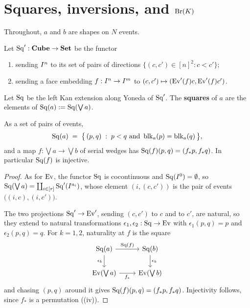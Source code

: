 \documentclass[11pt]{article}
\begin{document}
\section{Squares, inversions, and \texorpdfstring{$\operatorname{Br}(K)$}{Br(K)}}\label{sec:squares}


Throughout, $a$ and $b$ are shapes on $N$ events.

\begin{definition}\label{def:squares}
  Let $\operatorname{Sq}' : \mathbf{Cube} \to \mathbf{Set}$ be the functor
  \begin{enumerate}
    \item sending $I^{n}$ to its set of pairs of directions $\{(c,c') \in [n]^2 : c < c'\}$;
    \item sending a face embedding $f : I^{n} \to I^{m}$ to
      $(c,c') \mapsto (\operatorname{Ev}'(f)c, \operatorname{Ev}'(f)c')$.
  \end{enumerate}
  Let $\operatorname{Sq}$ be the left Kan extension along Yoneda of $\operatorname{Sq}'$. The \textbf{squares} of $a$ are the
  elements of $\operatorname{Sq}(a) := \operatorname{Sq}(\bigvee a)$.
\end{definition}

\begin{lemma}\label{lem:sq-coords}
  As a set of pairs of events,
  \[
    \operatorname{Sq}(a) \;=\; \bigl\{\, (p,q) \;:\; p < q \text{ and } \operatorname{blk}_a(p) = \operatorname{blk}_a(q) \,\bigr\} ,
  \]
  and a map $f : \bigvee a \to \bigvee b$ of serial wedges has $\operatorname{Sq}(f)(p,q) = (f_*p, f_*q)$. In
  particular $\operatorname{Sq}(f)$ is injective.
\end{lemma}
\begin{proof}
  As for $\operatorname{Ev}$, the functor $\operatorname{Sq}$ is cocontinuous and $\operatorname{Sq}(I^{0}) = \emptyset$, so
  $\operatorname{Sq}(\bigvee a) = \coprod_{i \in [r]} \operatorname{Sq}'(I^{a_i})$, whose element $(i,(c,c'))$ is the pair
  of events $\bigl((i,c),(i,c')\bigr)$.

  The two projections $\operatorname{Sq}' \to \operatorname{Ev}'$, sending $(c,c')$ to $c$ and to $c'$, are natural, so they
  extend to natural transformations $\epsilon_1, \epsilon_2 : \operatorname{Sq} \to \operatorname{Ev}$ with
  $\epsilon_1(p,q) = p$ and $\epsilon_2(p,q) = q$. For $k = 1, 2$, naturality at $f$ is the square
  \[
    \begin{tikzcd}
      \Sq(a) \arrow[r, "\Sq(f)"] \arrow[d, "\epsilon_k"'] & \Sq(b) \arrow[d, "\epsilon_k"] \\
      \Ev(\bigvee a) \arrow[r, "f_*"'] & \Ev(\bigvee b)
    \end{tikzcd}
  \]
  and chasing $(p,q)$ around it gives $\operatorname{Sq}(f)(p,q) = (f_*p, f_*q)$. Injectivity follows, since $f_*$ is a
  permutation ((iv)).
\end{proof}
\end{document}
